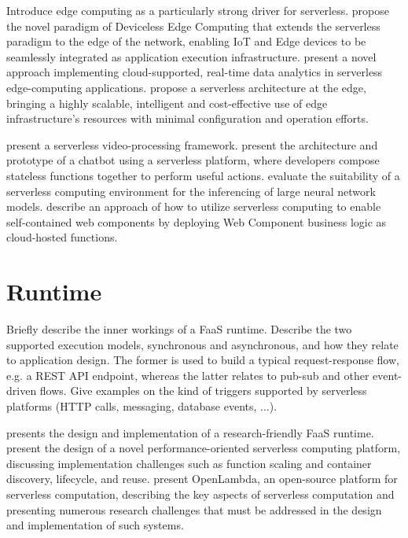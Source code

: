 \documentclass[utf8,english]{gradu3}
\begin{document}
Introduce edge computing as a particularly strong driver for serverless. \textcite{glikson17devicelessedge} propose the novel paradigm of Deviceless Edge Computing that extends the serverless paradigm to the edge of the network, enabling IoT and Edge devices to be seamlessly integrated as application execution infrastructure. \textcite{nastic17analyticsedge} present a novel approach implementing cloud-supported, real-time data analytics in serverless edge-computing applications. \textcite{baresi17edgecomputing} propose a serverless architecture at the edge, bringing a highly scalable, intelligent and cost-effective use of edge infrastructure’s resources with minimal configuration and operation efforts.

\textcite{fouladi2017encoding} present a serverless video-processing framework. \textcite{yan16chatbot} present the architecture and prototype of a chatbot using a serverless platform, where developers compose stateless functions together to perform useful actions. \textcite{ishakian17neural} evaluate the suitability of a serverless computing environment for the inferencing of large neural network models. \textcite{ast17webcomponent} describe an approach of how to utilize serverless computing to enable self-contained web components by deploying Web Component business logic as cloud-hosted functions.

\section{Runtime}

Briefly describe the inner workings of a FaaS runtime. Describe the two supported execution models, synchronous and asynchronous, and how they relate to application design. The former is used to build a typical request-response flow, e.g. a REST API endpoint, whereas the latter relates to pub-sub and other event-driven flows. Give examples on the kind of triggers supported by serverless platforms (HTTP calls, messaging, database events, ...).

\textcite{spillner17snafu} presents the design and implementation of a research-friendly FaaS runtime. \textcite{mcgrath17implement} present the design of a novel performance-oriented serverless computing platform, discussing implementation challenges such as function scaling and container discovery, lifecycle, and reuse. \textcite{hendrickson16openlambda} present OpenLambda, an open-source platform for serverless computation, describing the key aspects of serverless computation and presenting numerous research challenges that must be addressed in the design and implementation of such systems.
\end{document}
